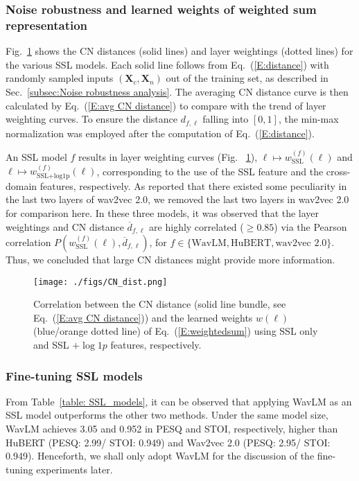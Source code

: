 \documentclass[a4paper]{article}
\begin{document}
\subsubsection{Noise robustness and learned weights of weighted sum representation}\label{subsec: Noise robustness}
Fig.~\ref{fig:CN_dist} shows the CN distances (solid lines) and layer weightings (dotted lines) for the various SSL models. Each solid line
follows from Eq.~(\ref{E:distance}) with randomly sampled inputs $(\mathbf{X}_c, \mathbf{X}_n)$ out of the training set, as described in Sec.~\ref{subsec:Noise robustness analysis}. The averaging CN distance curve is then calculated by Eq.~(\ref{E:avg CN distance}) to compare with the trend of layer weighting curves. To ensure the distance $d_{f, \ell}$ falling into $[0, 1]$, the min-max normalization was employed after the computation of Eq.~(\ref{E:distance}).






An SSL model $f$ results in layer weighting curves (Fig. ~\ref{fig:CN_dist}), $\ell \mapsto w_{\text{SSL}}^{(f)}(\ell)$ and $ \ell \mapsto w_{\text{SSL+log1p}}^{(f)}(\ell)$, corresponding to the use of the SSL feature and the cross-domain features, respectively.
As \cite{9688093} reported that there existed some peculiarity in the last two layers of wav2vec 2.0, we removed the last two layers in wav2vec 2.0 for comparison here. In these three models, it was observed that the layer weightings and CN distance $\overline{d}_{f, \ell}$ are highly correlated ($\geq 0.85$) via the Pearson correlation $P(w_{\text{SSL}}^{(f)}(\ell), \overline{d}_{f, \ell})$, for $f \in \{ \text{WavLM}, \text{HuBERT}, \text{wav2vec 2.0} \}$. Thus, we concluded that large CN distances might provide more information.



\begin{figure}[ht]
  \centering
  \texttt{[image: ./figs/CN\_dist.png]}
  \caption{Correlation between the CN distance (solid line bundle, see Eq.~(\ref{E:avg CN distance})) and the learned weights $w(\ell)$ (blue/orange dotted line) of Eq.~(\ref{E:weightedsum}) using SSL only and SSL $+ \log 1p$ features, respectively.}
  \label{fig:CN_dist}
\end{figure}


\subsubsection{Fine-tuning SSL models}
From Table~\ref{table: SSL_models}, it can be observed that applying WavLM as an SSL model outperforms the other two methods. Under the same model size, WavLM achieves 3.05 and 0.952 in PESQ and STOI, respectively, higher than HuBERT (PESQ: 2.99/ STOI: 0.949) and Wav2vec 2.0 (PESQ: 2.95/ STOI: 0.949). Henceforth, we shall only adopt WavLM for the discussion of the fine-tuning experiments later.
\end{document}
